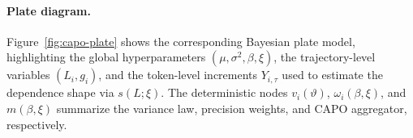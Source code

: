 \documentclass[12pt]{cs}
\theoremstyle{remark}
\begin{document}
\paragraph{Plate diagram.}
Figure~\ref{fig:capo-plate} shows the corresponding Bayesian plate model, highlighting the global hyperparameters \((\mu,\sigma^2,\beta,\xi)\), the trajectory-level variables \((L_i,g_i)\), and the token-level increments \(Y_{i,\tau}\) used to estimate the dependence shape via \(s(L;\xi)\). The deterministic nodes \(v_i(\vartheta)\), \(\omega_i(\beta,\xi)\), and \(m(\beta,\xi)\) summarize the variance law, precision weights, and CAPO aggregator, respectively.








\end{document}

